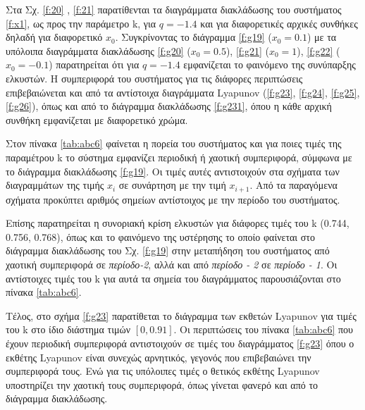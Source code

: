Στα Σχ. \ref{f:20} , \ref{f:21} παρατίθενται τα διαγράμματα διακλάδωσης του συστήματος \ref{f:x1}, ως προς την παράμετρο k, για $q =- 1.4$ και για διαφορετικές αρχικές συνθήκες δηλαδή για διαφορετικό \(x_0\). Συγκρίνοντας το διάγραμμα \ref{f:g19} (\(x_0=0.1\)) με τα υπόλοιπα διαγράμματα διακλάδωσης \ref{f:g20} (\(x_0=0.5\)), \ref{f:g21} (\(x_0=1\)), \ref{f:g22} (\(x_0=-0.1\)) παρατηρείται ότι για $q=-1.4$ εμφανίζεται το φαινόμενο της συνύπαρξης ελκυστών. Η συμπεριφορά του συστήματος για τις διάφορες περιπτώσεις επιβεβαιώνεται και από τα αντίστοιχα διαγράμματα Lyapunov (\ref{f:g23}, \ref{f:g24}, \ref{f:g25}, \ref{f:g26}), όπως και από το διάγραμμα διακλάδωσης \ref{f:g231}, όπου η κάθε αρχική συνθήκη εμφανίζεται με διαφορετικό χρώμα.

Στον πίνακα \ref{tab:abc6} φαίνεται η πορεία του συστήματος και για ποιες τιμές της παραμέτρου k το σύστημα εμφανίζει περιοδική ή χαοτική συμπεριφορά, σύμφωνα με το διάγραμμα διακλάδωσης \ref{f:g19}. Οι τιμές αυτές αντιστοιχούν στα σχήματα των διαγραμμάτων της τιμής \(x_i\) σε συνάρτηση με την τιμή \(x_{i+1}\). Από τα παραγόμενα σχήματα προκύπτει αριθμός σημείων αντίστοιχος με την περίοδο του συστήματος.

Επίσης παρατηρείται η συνοριακή κρίση ελκυστών για διάφορες τιμές του
k (0.744, 0.756, 0.768), όπως και το φαινόμενο της υστέρησης το οποίο φαίνεται στο διάγραμμα διακλάδωσης του Σχ. \ref{f:g19} στην μεταπήδηση του συστήματος από χαοτική συμπεριφορά σε \emph{περίοδο-2}, αλλά και από \emph{περίοδο - 2} σε \emph{περίοδο - 1}. Οι αντίστοιχες τιμές του k για αυτά τα σημεία του διαγράμματος παρουσιάζονται στο πίνακα \ref{tab:abc6}.

Τέλος, στο σχήμα \ref{f:g23} παρατίθεται το διάγραμμα των εκθετών Lyapunov για τιμές του k στο ίδιο διάστημα τιμών $[0, 0.91]$. Οι περιπτώσεις του πίνακα \ref{tab:abc6} που έχουν περιοδική συμπεριφορά αντιστοιχούν σε τιμές του διαγράμματος \ref{f:g23} όπου ο εκθέτης Lyapunov είναι συνεχώς αρνητικός, γεγονός που επιβεβαιώνει την συμπεριφορά τους. Ενώ για τις υπόλοιπες τιμές ο θετικός εκθέτης Lyapunov υποστηρίζει την χαοτική τους συμπεριφορά, όπως γίνεται φανερό και από το διάγραμμα διακλάδωσης.


